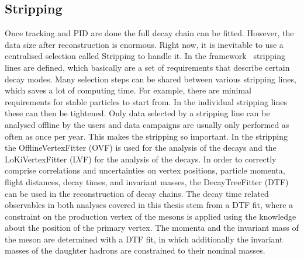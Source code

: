 
\subsection{Stripping}
\label{sec:detector:software:stripping}

Once tracking and PID are done the full decay chain can be fitted. However,
the data size after reconstruction is enormous. Right now, it is inevitable to
use a centralised selection called Stripping to handle it. In the \davinci
framework~\cite{DaVinci} stripping lines are defined, which basically are a
set of requirements that describe certain decay modes. Many selection steps
can be shared between various stripping lines, which saves a lot of computing
time. For example, there are minimal requirements for stable particles to
start from. In the individual stripping lines these can then be tightened.
Only data selected by a stripping line can be analysed offline by the users
and data campaigns are usually only performed as often as once per year. This
makes the stripping so important. In the stripping the OfflineVertexFitter
(OVF) is used for the analysis of the \BdToJPsiKS decays and the
LoKiVertexFitter (LVF) for the analysis of the \BdToDD decays. In order to
correctly comprise correlations and uncertainties on vertex positions,
particle momenta, flight distances, decay times, and invariant masses, the
\mbox{DecayTreeFitter} (DTF)~\cite{Hulsbergen:2005pu} can be used in the
reconstruction of decay chains. The decay time related observables in both
analyses covered in this thesis stem from a DTF fit, where a constraint on the
production vertex of the \Bd mesons is applied using the knowledge about the
position of the primary vertex. The momenta and the invariant mass of the \Bd
meson are determined with a DTF fit, in which additionally the invariant masses
of the daughter hadrons are constrained to their nominal masses.